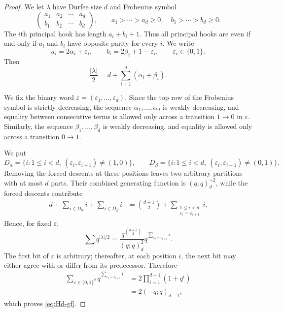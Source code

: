 \documentclass[11pt]{article}
\theoremstyle{definition}
\theoremstyle{remark}
\begin{document}
\begin{proof}
We let $\lambda$ have Durfee size $d$ and Frobenius symbol
\[
 \begin{pmatrix}
  a_1&a_2&\cdots&a_d\\
  b_1&b_2&\cdots&b_d
 \end{pmatrix},
 \qquad
 a_1>\cdots>a_d\geq0,
 \quad
 b_1>\cdots>b_d\geq0.
\]
The $i$th principal hook has length $a_i+b_i+1$.  Thus all principal hooks are even if and only if $a_i$ and $b_i$ have opposite parity for every $i$.  We write
\begin{equation}\label{eq:frob-parity-split}
 a_i=2\alpha_i+\varepsilon_i,
 \qquad
 b_i=2\beta_i+1-\varepsilon_i,
 \qquad
 \varepsilon_i\in\{0,1\}.
\end{equation}
Then
\begin{equation}\label{eq:half-size-frob}
 \frac{|\lambda|}{2}
 =d+\sum_{i=1}^d(\alpha_i+\beta_i).
\end{equation}

We fix the binary word $\varepsilon=(\varepsilon_1,\ldots,\varepsilon_d)$.  Since the top row of the Frobenius symbol is strictly decreasing, the sequence $\alpha_1,\ldots,\alpha_d$ is weakly decreasing, and equality between consecutive terms is allowed only across a transition $1\to0$ in $\varepsilon$.  Similarly, the sequence $\beta_1,\ldots,\beta_d$ is weakly decreasing, and equality is allowed only across a transition $0\to1$.

We put
\[
 D_\alpha=\{i:1\leq i<d,\ (\varepsilon_i,\varepsilon_{i+1})\neq(1,0)\},
 \qquad
 D_\beta=\{i:1\leq i<d,\ (\varepsilon_i,\varepsilon_{i+1})\neq(0,1)\}.
\]
Removing the forced descents at these positions leaves two arbitrary partitions with at most $d$ parts.  Their combined generating function is $(q;q)_d^{-2}$, while the forced descents contribute
\begin{align*}
 d+\sum_{i\in D_\alpha}i+\sum_{i\in D_\beta}i
 &=\binom{d+1}{2}
   +\sum_{\substack{1\leq i<d\\ \varepsilon_i=\varepsilon_{i+1}}}i.
\end{align*}
Hence, for fixed $\varepsilon$,
\[
 \sum q^{|\lambda|/2}
 =\frac{q^{\binom{d+1}{2}}}{(q;q)_d^2}
  q^{\sum_{\varepsilon_i=\varepsilon_{i+1}}i}.
\]
The first bit of $\varepsilon$ is arbitrary; thereafter, at each position $i$, the next bit may either agree with or differ from its predecessor.  Therefore
\begin{align*}
 \sum_{\varepsilon\in\{0,1\}^d}
 q^{\sum_{\varepsilon_i=\varepsilon_{i+1}}i}
 &=2\prod_{i=1}^{d-1}(1+q^i)\\
 &=2(-q;q)_{d-1},
\end{align*}
which proves \eqref{eq:Hd-gf}.


\end{proof}
\end{document}
